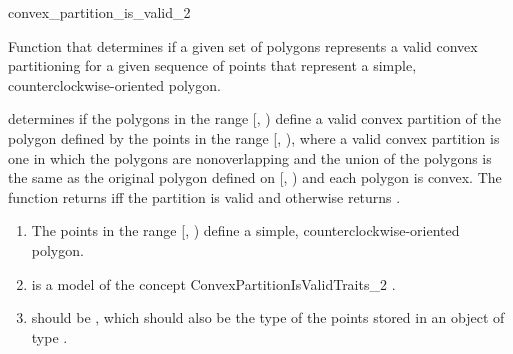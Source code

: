\renewcommand\ccRefPageBegin{\ccParDims\cgalColumnLayout\begin{ccAdvanced}}
\renewcommand\ccRefPageEnd{\ccParDims\cgalColumnLayout\end{ccAdvanced}}
\begin{ccRefFunction}{convex_partition_is_valid_2}

\ccDefinition
Function that determines if a given set of polygons represents
a valid convex partitioning for a given sequence of points that represent a
simple, counterclockwise-oriented polygon.  


{
determines if the polygons in the range [, )
define a valid convex partition of the polygon defined by the points in the 
range [, ), where a valid convex partition 
is one in which the polygons are nonoverlapping and the union of the polygons 
is the same as the original polygon defined on [, 
) and each polygon is convex.
The function returns  iff the partition is valid and otherwise
returns .
}

\begin{enumerate}
    \item The points in the range [, ) define
          a simple, counterclockwise-oriented polygon.
    \item {} is a model of the concept
          ConvexPartitionIsValidTraits\_2%
          .
    \item {} should be ,
          which should also be the type of the points stored in an object
          of type .
\end{enumerate}


\end{ccRefFunction}
